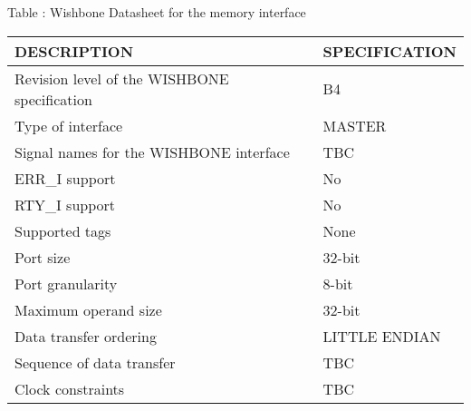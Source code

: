 {
  \vspace{0.5em}
  \begin{center}
    Table \thetable: Wishbone Datasheet for the memory interface \label{tab:wishbone-datasheet}
  \end{center}

\footnotesize
\begin{xltabular}{0.9\textwidth}{|l|X|}
  \hline
  \textbf{DESCRIPTION} & \textbf{SPECIFICATION} \\
  \hline
  Revision level of the WISHBONE specification & B4 \\
  \hline
  Type of interface & MASTER \\
  \hline
  Signal names for the WISHBONE interface & TBC \\
  \hline
  ERR\_I support & No \\
  \hline
  RTY\_I support & No \\
  \hline
  Supported tags & None \\
  \hline
  Port size & 32-bit \\
  \hline
  Port granularity & 8-bit \\
  \hline
  Maximum operand size & 32-bit \\
  \hline
  Data transfer ordering & LITTLE ENDIAN \\
  \hline
  Sequence of data transfer & TBC \\
  \hline
  Clock constraints & TBC \\
  \hline
\end{xltabular}
}
